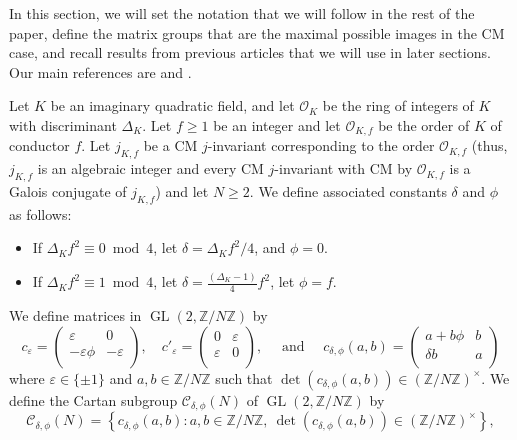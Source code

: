 \documentclass[11pt]{amsart}
\theoremstyle{definition}
\newcommand{\Z}{\mathbb{Z}}
\newcommand{\OK}{\mathcal{O}_K}
\newcommand{\cC}{\mathcal{C}}
\newcommand{\OO}{\mathcal{O}}
\newcommand{\GL}{\operatorname{GL}}
\begin{document}
In this section, we will set the notation that we will follow in the rest of the paper, define the matrix groups that are the maximal possible images in the CM case, and recall results from previous articles that we will use in later sections. Our main references are \cite{lozano-galoiscm} and \cite{modelspaper}.

Let $K$ be an imaginary quadratic field, and let $\OK$ be the ring of integers of $K$ with discriminant $\Delta_K$. Let $f\geq 1$ be an integer and let $\OO_{K,f}$ be the order of $K$ of conductor $f$. Let $j_{K,f}$ be a CM $j$-invariant corresponding to the order $\OO_{K,f}$ (thus, $j_{K,f}$ is an algebraic integer and every CM $j$-invariant with CM by $\OO_{K,f}$ is a Galois conjugate of $j_{K,f}$) and let $N\geq 2$. We define associated constants $\delta$ and $\phi$ as follows:
\begin{itemize}
    \item If $\Delta_Kf^2\equiv 0\bmod 4$, let $\delta=\Delta_K f^2/4$, and $\phi=0$.
	\item If $\Delta_Kf^2\equiv 1 \bmod 4$, let $\delta=\frac{(\Delta_K-1)}{4}f^2$, let $\phi=f$.
\end{itemize}
We define matrices in $\GL(2,\Z/N\Z)$ by
$$c_\varepsilon=\left(\begin{array}{cc} \varepsilon & 0\\ -\varepsilon\phi & -\varepsilon\\\end{array}\right),\quad c'_\varepsilon = \left(\begin{array}{cc} 0 & \varepsilon \\ \varepsilon & 0 \\ \end{array}\right), \quad \text{ and } \quad c_{\delta,\phi}(a,b)=\left(\begin{array}{cc}a+b\phi & b\\ \delta b & a\\ \end{array}\right)$$ where $\varepsilon \in \{\pm 1\}$ and $a,b \in \Z/N\Z$ such that $\det(c_{\delta,\phi}(a,b))\in (\Z/N\Z)^\times$. 
We define the Cartan subgroup $\cC_{\delta,\phi}(N)$ of $\GL(2,\Z/N\Z)$ by
$$\cC_{\delta,\phi}(N)=\left\{c_{\delta,\phi}(a,b): a,b\in\Z/N\Z,\  \det(c_{\delta,\phi}(a,b)) \in (\Z/N\Z)^\times \right\},$$
\end{document}
